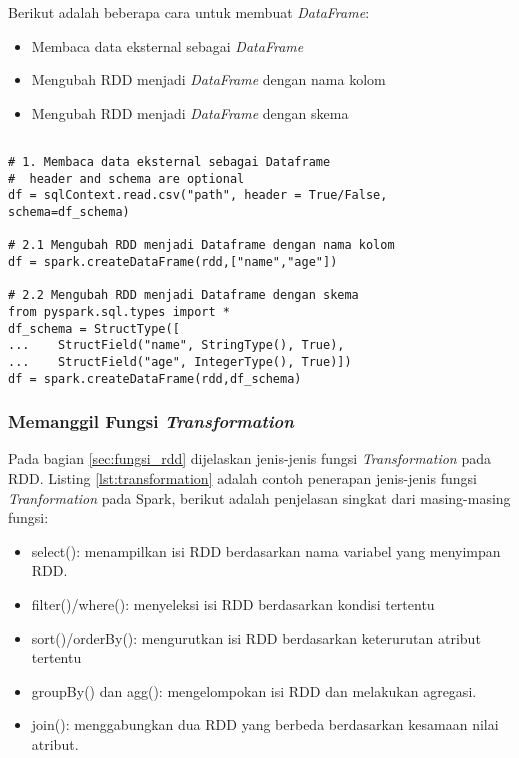 \noindent Berikut adalah beberapa cara untuk membuat \textit{DataFrame}:
\begin{itemize}
\item Membaca data eksternal sebagai \textit{DataFrame}
\item Mengubah RDD menjadi \textit{DataFrame} dengan nama kolom
\item Mengubah RDD menjadi \textit{DataFrame} dengan skema
\end{itemize}
\begin{lstlisting}[basicstyle=\ttfamily, frame=single,
	columns=fullflexible, keepspaces=true, breaklines=true, label=ls_kepatuhan_1_1_1_logo_sharif_judge, caption=Cara Pembuatan Dataframe]
	
# 1. Membaca data eksternal sebagai Dataframe
#  header and schema are optional
df = sqlContext.read.csv("path", header = True/False, schema=df_schema)

# 2.1 Mengubah RDD menjadi Dataframe dengan nama kolom
df = spark.createDataFrame(rdd,["name","age"])

# 2.2 Mengubah RDD menjadi Dataframe dengan skema
from pyspark.sql.types import *
df_schema = StructType([
...    StructField("name", StringType(), True),
...    StructField("age", IntegerType(), True)])
df = spark.createDataFrame(rdd,df_schema)

\end{lstlisting}

\newpage
\subsubsection{Memanggil Fungsi \textit{Transformation}}
\noindent Pada bagian \ref{sec:fungsi_rdd} dijelaskan jenis-jenis fungsi \textit{Transformation} pada RDD. Listing \ref{lst:transformation} adalah contoh penerapan jenis-jenis fungsi \textit{Tranformation} pada Spark, berikut adalah penjelasan singkat dari masing-masing fungsi:
\begin{itemize}
\item select(): menampilkan isi RDD berdasarkan nama variabel yang menyimpan RDD.
\item filter()/where(): menyeleksi isi RDD berdasarkan kondisi tertentu
\item sort()/orderBy(): mengurutkan isi RDD berdasarkan keterurutan atribut tertentu
\item groupBy() dan agg(): mengelompokan isi RDD dan melakukan agregasi.
\item join(): menggabungkan dua RDD yang berbeda berdasarkan kesamaan nilai atribut.
\end{itemize}

